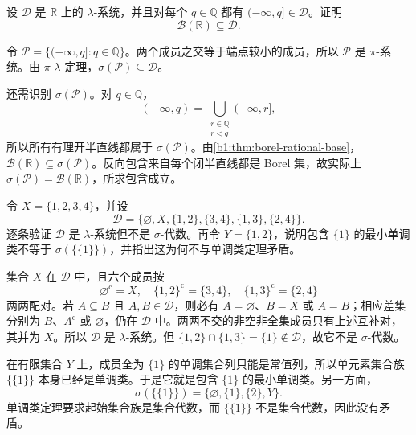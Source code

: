 \begin{exercise}
\label{b1:ex:04}
设 \(\mathcal D\) 是 \(\mathbb R\) 上的 \(\lambda\)-系统，并且对每个 \(q\in\mathbb Q\) 都有 \(( -\infty,q]\in\mathcal D\)。证明
\[
\mathcal B(\mathbb R)\subseteq\mathcal D.
\]
\end{exercise}
\begin{solution}
令
\(
\mathcal P=\{( -\infty,q]:q\in\mathbb Q\}
\)。两个成员之交等于端点较小的成员，所以 \(\mathcal P\) 是 \(\pi\)-系统。由 \(\pi\)-\(\lambda\) 定理，\(\sigma(\mathcal P)\subseteq\mathcal D\)。

还需识别 \(\sigma(\mathcal P)\)。对 \(q\in\mathbb Q\)，
\[
( -\infty,q)
=\bigcup_{\substack{r\in\mathbb Q\\r<q}}( -\infty,r],
\]
所以所有有理开半直线都属于 \(\sigma(\mathcal P)\)。由\cref{b1:thm:borel-rational-base}，\(\mathcal B(\mathbb R)\subseteq\sigma(\mathcal P)\)。反向包含来自每个闭半直线都是 Borel 集，故实际上 \(\sigma(\mathcal P)=\mathcal B(\mathbb R)\)，所求包含成立。
\end{solution}

\begin{exercise}
\label{b1:ex:05}
令 \(X=\{1,2,3,4\}\)，并设
\[
\mathcal D
=\bigl\{\varnothing,X,\{1,2\},\{3,4\},\{1,3\},\{2,4\}\bigr\}.
\]
逐条验证 \(\mathcal D\) 是 \(\lambda\)-系统但不是 \(\sigma\)-代数。再令 \(Y=\{1,2\}\)，说明包含 \(\{1\}\) 的最小单调类不等于 \(\sigma(\bigl\{\{1\}\bigr\})\)，并指出这为何不与单调类定理矛盾。
\end{exercise}
\begin{solution}
集合 \(X\) 在 \(\mathcal D\) 中，且六个成员按
\[
\varnothing^{\mathrm c}=X,
\quad
\{1,2\}^{\mathrm c}=\{3,4\},
\quad
\{1,3\}^{\mathrm c}=\{2,4\}
\]
两两配对。若 \(A\subseteq B\) 且 \(A,B\in\mathcal D\)，则必有 \(A=\varnothing\)、\(B=X\) 或 \(A=B\)；相应差集分别为 \(B\)、\(A^{\mathrm c}\) 或 \(\varnothing\)，仍在 \(\mathcal D\) 中。两两不交的非空非全集成员只有上述互补对，其并为 \(X\)。所以 \(\mathcal D\) 是 \(\lambda\)-系统。但
\(
\{1,2\}\cap\{1,3\}=\{1\}\notin\mathcal D
\)，故它不是 \(\sigma\)-代数。

在有限集合 \(Y\) 上，成员全为 \(\{1\}\) 的单调集合列只能是常值列，所以单元素集合族 \(\bigl\{\{1\}\bigr\}\) 本身已经是单调类。于是它就是包含 \(\{1\}\) 的最小单调类。另一方面，
\[
\sigma(\bigl\{\{1\}\bigr\})
=\bigl\{\varnothing,\{1\},\{2\},Y\bigr\}.
\]
单调类定理要求起始集合族是集合代数，而 \(\bigl\{\{1\}\bigr\}\) 不是集合代数，因此没有矛盾。
\end{solution}

